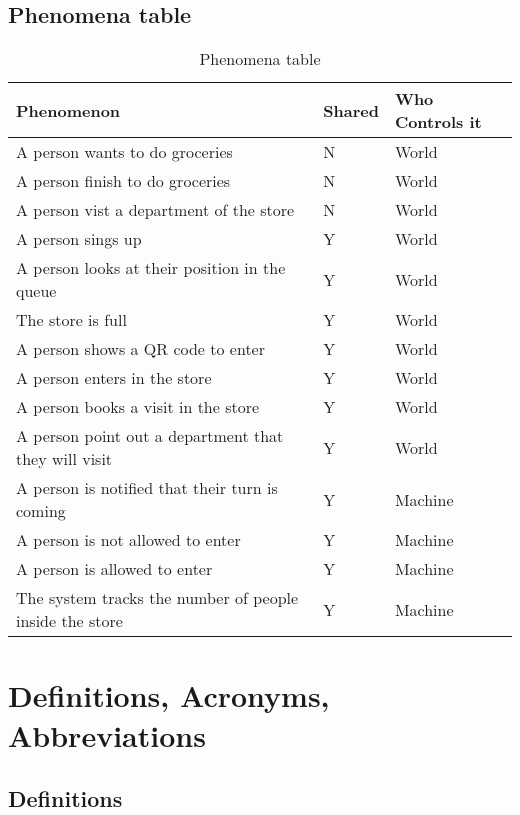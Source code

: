\subsection{Phenomena table}

\begin{table}[H]
\centering
\begin{tabular}{| m{} | m{} | m{} |} 
	\hline
	 \textbf{Phenomenon} & \textbf{Shared} &  \textbf{Who Controls it} \\
	\hline
	A person wants to do groceries &  N & World \\ 
	\hline
	A person finish to do groceries  & N &  World \\ 
	\hline
	A person vist a department of the store & N & World \\
	\hline
	A person sings up & Y & World \\ 
	\hline
	A person looks at their position in the queue & Y & World \\ 
	\hline
	The store is full & Y & World \\ 
	\hline
	A person shows a QR code to enter & Y & World \\ 
	\hline
	A person enters in the store & Y & World \\ 
	\hline
	A person books a visit in the store & Y & World \\ 
	\hline
	A person point out a department that they will visit & Y & World \\ 
	\hline
	A person is notified that their turn is coming & Y & Machine \\ 
	\hline
	A person is not allowed to enter & Y & Machine \\
	\hline
	A person is  allowed to enter & Y & Machine \\
	\hline
	The system tracks the number of people inside the store & Y & Machine \\
	\hline
\end{tabular}
\caption{Phenomena table}
\label{tablePhenomenatable}
\end{table}

\section{Definitions, Acronyms, Abbreviations}

\subsection{Definitions}

